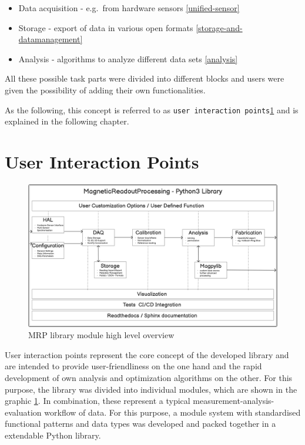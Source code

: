 \begin{itemize}
\tightlist
\item
  Data acquisition - e.g.~from hardware sensors \ref{unified-sensor}
\item
  Storage - export of data in various open formats
  \ref{storage-and-datamanagement}
\item
  Analysis - algorithms to analyze different data sets \ref{analysis}
\end{itemize}

All these possible task parts were divided into different blocks and
users were given the possibility of adding their own functionalities.

As the following, this concept is referred to as
\passthrough{\lstinline!user interaction points!}\ref{user-interaction-points}
and is explained in the following chapter.

\hypertarget{user-interaction-points}{%
\section{User Interaction Points}\label{user-interaction-points}}

\begin{figure}
\centering
\includegraphics{./generated_images/border_MRP_library_module_high_level_overview.png}
\caption{MRP library module high level overview
\label{MRP_library_module_high_level_overview.png}}
\end{figure}

User interaction points represent the core concept of the developed
library and are intended to provide user-friendliness on the one hand
and the rapid development of own analysis and optimization algorithms on
the other. For this purpose, the library was divided into individual
modules, which are shown in the graphic
\ref{MRP_library_module_high_level_overview.png}. In combination, these
represent a typical measurement-analysis-evaluation workflow of data.
For this purpose, a module system with standardised functional patterns
and data types was developed and packed together in a extendable Python
library.

